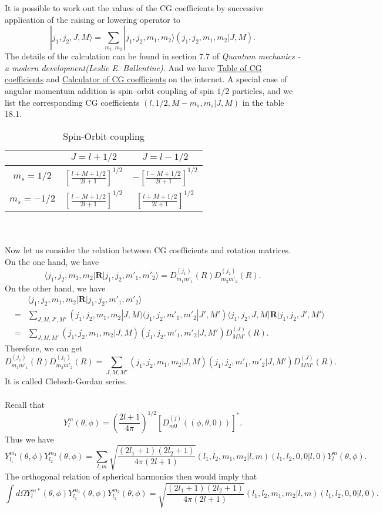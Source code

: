 It is possible to work out the values of the CG coefficients by successive application of the raising or lowering operator to
\[|j_1,j_2,J,M\rangle = \sum_{m_1,m_2} |j_1,j_2,m_1,m_2\rangle (j_1,j_2,m_1,m_2|J,M).\]
The details of the calculation can be found in section 7.7 of \emph{Quantum mechanics - a modern development(Leslie E. Ballentine)}. And we have \href{https://en.wikipedia.org/wiki/Table_of_Clebsch-Gordan_coefficients}{Table of CG coefficients} and \href{http://www.wolframalpha.com/input/?i=CG+coefficient}{Calculator of CG coefficients} on the internet. A special case of angular momentum addition is spin–orbit coupling of spin $1/2$ particles, and we list the corresponding CG coefficients $(l, 1/2, M-m_s, m_s|J,M)$ in the table 18.1.
\begin{table}[!th]
\centering
\begin{tabular}{|c|c|c|}
\hline
 & $J=l+1/2$ & $J=l-1/2$ \\
 \hline
 $m_s = 1/2$ & $\left[ \frac{l+M+1/2}{2l+1}\right ]^{1/2} $ & $-\left[ \frac{l-M+1/2}{2l+1}\right ]^{1/2} $ \\
 \hline
 $m_s = -1/2$ & $\left[ \frac{l-M+1/2}{2l+1}\right ]^{1/2} $ & $\left[ \frac{l+M+1/2}{2l+1}\right ]^{1/2} $ \\
\hline
\end{tabular}
\caption{Spin-Orbit coupling}
\end{table}
\\ \\
Now let us consider the relation between CG coefficients and rotation matrices. On the one hand, we have
\[\langle j_1,j_2,m_1,m_2 | \bm{R} | j_1,j_2,m'_1,m'_2\rangle = D_{m_1m'_1}^{(j_1)}(R) D_{m_2m'_2}^{(j_2)}(R).\]
On the other hand, we have
\begin{eqnarray}
&\phantom{=}& \langle j_1,j_2,m_1,m_2 | \bm{R} | j_1,j_2,m'_1,m'_2\rangle \nonumber \\
&=& \sum_{J,M,J',M'} (j_1,j_2,m_1,m_2|J,M) (j_1,j_2,m'_1,m'_2|J',M')  \langle j_1,j_2,J,M | \bm{R} | j_1,j_2,J',M'\rangle \nonumber \\
&=& \sum_{J,M,M'} (j_1,j_2,m_1,m_2|J,M) (j_1,j_2,m'_1,m'_2|J,M')D_{MM'}^{(J)}(R) .\nonumber
\end{eqnarray}
Therefore, we can get
\[D_{m_1m'_1}^{(j_1)}(R) D_{m_2m'_2}^{(j_2)}(R) = \sum_{J,M,M'} (j_1,j_2,m_1,m_2|J,M) (j_1,j_2,m'_1,m'_2|J,M')D_{MM'}^{(J)}(R).\]
It is called Clebsch-Gordan series.
\\ \\
Recall that
\[Y_l^m(\theta,\phi) =  \left( \frac{2l+1}{4\pi} \right) ^{1/2} [D_{m0}^{(j)}((\phi,\theta,0))]^* .\]
Thus we have
\[Y_{l_1}^{m_1}(\theta,\phi) Y_{l_2}^{m_2}(\theta,\phi) = \sum_{l,m} \sqrt{\frac{(2l_1+1)(2l_2+1)}{4\pi(2l+1)}} (l_1,l_2,m_1,m_2|l,m) (l_1,l_2,0,0|l,0) Y_l^m(\theta,\phi).\]
The orthogonal relation of spherical harmonics then would imply that
\[\int d\Omega Y_l^{m*}(\theta,\phi)Y_{l_1}^{m_1}(\theta,\phi) Y_{l_2}^{m_2}(\theta,\phi) = \sqrt{\frac{(2l_1+1)(2l_2+1)}{4\pi(2l+1)}} (l_1,l_2,m_1,m_2|l,m) (l_1,l_2,0,0|l,0).\]

